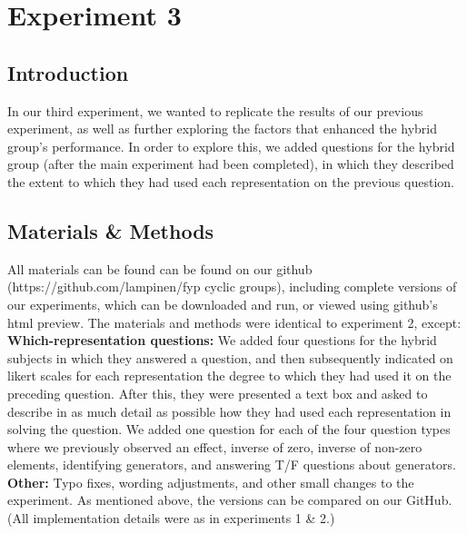 \documentclass[11pt]{article}
\begin{document}
\section{Experiment 3}
\subsection{Introduction}
In our third experiment, we wanted to replicate the results of our previous experiment, as well as further exploring the factors that enhanced the hybrid group's performance. In order to explore this, we added questions for the hybrid group (after the main experiment had been completed), in which they described the extent to which they had used each representation on the previous question. 
\subsection{Materials \& Methods} 
All materials can be found can be found on our github (https://github.com/lampinen/fyp cyclic groups), including complete versions of our experiments, which can be downloaded and run, or viewed using github's html preview. The materials and methods were identical to experiment 2, except:\\[11pt]
\textbf{Which-representation questions:} We added four questions for the hybrid subjects in which they answered a question, and then subsequently indicated on likert scales for each representation the degree to which they had used it on the preceding question. After this, they were presented a text box and asked to describe in as much detail as possible how they had used each representation in solving the question. We added one question for each of the four question types where we previously observed an effect, inverse of zero, inverse of non-zero elements, identifying generators, and answering T/F questions about generators. \\[11pt]
\textbf{Other:} Typo fixes, wording adjustments, and other small changes to the experiment. As mentioned above, the versions can be compared on our GitHub.\\[11pt]
(All implementation details were as in experiments 1 \& 2.)
\end{document}
